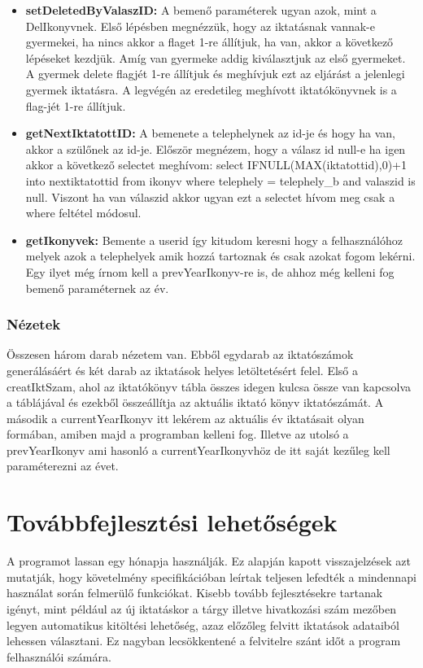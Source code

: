 \documentclass[
]{thesis-ekf}
\theoremstyle{definition}
\theoremstyle{remark}
\begin{document}
\begin{itemize}[leftmargin=0pt]
	\item[] \textbf{setDeletedByValaszID: }A bemenő paraméterek ugyan azok, mint a DelIkonyvnek. Első lépésben megnézzük, hogy az iktatásnak vannak-e gyermekei, ha nincs akkor a flaget 1-re állítjuk, ha van, akkor a következő lépéseket kezdjük. Amíg van gyermeke addig kiválasztjuk az első gyermeket. A gyermek delete flagjét 1-re állítjuk és meghívjuk ezt az eljárást a jelenlegi gyermek iktatásra. A legvégén az eredetileg meghívott iktatókönyvnek is a flag-jét 1-re állítjuk. 
	\item[] \textbf{getNextIktatottID: }A bemenete a telephelynek az id-je és hogy ha van, akkor a szülőnek az id-je. Először megnézem, hogy a válasz id null-e ha igen akkor a következő selectet meghívom:  select IFNULL(MAX(iktatottid),0)+1 into nextiktatottid from ikonyv where telephely = telephely\_b and valaszid is null. Viszont ha van válaszid akkor ugyan ezt a selectet hívom meg csak a where feltétel módosul.
	\item[] \textbf{getIkonyvek: }Bemente a userid így kitudom keresni hogy a felhasználóhoz melyek azok a telephelyek amik hozzá tartoznak és csak azokat fogom lekérni. Egy ilyet még írnom kell a prevYearIkonyv-re is, de ahhoz még kelleni fog bemenő paraméternek az év. 
\end{itemize}
\subsection{Nézetek}
Összesen három darab nézetem van. Ebből egydarab az iktatószámok generálásáért és két darab az iktatások helyes letöltetésért felel. Első a creatIktSzam, ahol az iktatókönyv tábla összes idegen kulcsa össze van kapcsolva a táblájával és ezekből összeállítja az aktuális iktató könyv iktatószámát. A második a currentYearIkonyv itt lekérem az aktuális év iktatásait olyan formában, amiben majd a programban kelleni fog. Illetve az utolsó a prevYearIkonyv ami hasonló a currentYearIkonyvhöz de itt saját kezűleg kell paraméterezni az évet.
\chapter{Továbbfejlesztési lehetőségek}
A programot lassan egy hónapja használják. Ez alapján kapott visszajelzések azt mutatják, hogy követelmény specifikációban leírtak teljesen lefedték a mindennapi használat során felmerülő funkciókat. Kisebb tovább fejlesztésekre tartanak igényt, mint például az új iktatáskor a tárgy illetve hivatkozási szám mezőben legyen automatikus kitöltési lehetőség, azaz előzőleg felvitt iktatások adataiból lehessen választani. Ez nagyban lecsökkentené a felvitelre szánt időt a program felhasználói számára.
\end{document}
